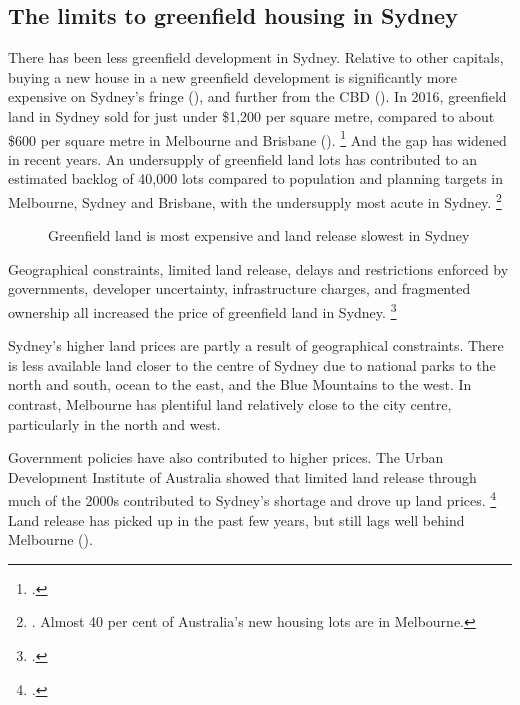 \subsection{The limits to greenfield housing in Sydney}\label{subsec:the-limits-to-greenfield-housing-in-sydney}

There has been less greenfield development in Sydney.
Relative to other capitals, buying a new house in a new greenfield development is significantly more expensive on Sydney's fringe (), and further from the CBD ().
In 2016, greenfield land in Sydney sold for just under \$1,200 per square metre, compared to about \$600 per square metre in Melbourne and Brisbane ().%
	\footcite{UDIA2017StateofLand}
And the gap has widened in recent years.
An undersupply of greenfield land lots has contributed to an estimated backlog of 40,000 lots compared to population and planning targets in Melbourne, Sydney and Brisbane, with the undersupply most acute in Sydney.%
	\footnote{\textcite[][6]{UDIA2017StateofLand}.
	Almost 40 per cent of Australia's new housing lots are in Melbourne.}

\begin{figure}
\caption{Greenfield land is most expensive and land release slowest in Sydney}\label{fig:greenfield-land-three-panel}
\end{figure}


Geographical constraints, limited land release, delays and restrictions enforced by governments, developer uncertainty, infrastructure charges, and fragmented ownership all increased the price of greenfield land in Sydney.%
	\footcites{GlaeserGyourko2017EconImplications}{Saiz2010Geog}{HsiehEtAlSupply2012}{Urbis2011Housing}{Property-Council-2016-Delays-costing-new-homebuyers}{PC2011PerformanceBenchmark}

Sydney's higher land prices are partly a result of geographical constraints.
There is less available land closer to the centre of Sydney due to national parks to the north and south, ocean to the east, and the Blue Mountains to the west.
In contrast, Melbourne has plentiful land relatively close to the city centre, particularly in the north and west.

Government policies have also contributed to higher prices.
The Urban Development Institute of Australia showed that limited land release through much of the 2000s contributed to Sydney's shortage and drove up land prices.%
	\footcite{UDIA2017StateofLand} Land release has picked up in the past few years, but still lags well behind Melbourne ().

